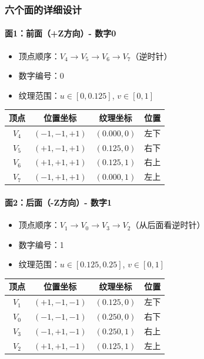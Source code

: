 \documentclass[12pt,a4paper]{article}
\begin{document}
\subsubsection{六个面的详细设计}

\paragraph{面1：前面（+Z方向）- 数字0}

\begin{itemize}
    \item 顶点顺序：$V_4 \to V_5 \to V_6 \to V_7$（逆时针）
    \item 数字编号：0
    \item 纹理范围：$u \in [0, 0.125]$, $v \in [0, 1]$
\end{itemize}

\begin{table}[H]
\centering
\begin{tabular}{|c|c|c|c|}
\hline
\textbf{顶点} & \textbf{位置坐标} & \textbf{纹理坐标} & \textbf{位置} \\
\hline
$V_4$ & $(-1, -1, +1)$ & $(0.000, 0)$ & 左下 \\
$V_5$ & $(+1, -1, +1)$ & $(0.125, 0)$ & 右下 \\
$V_6$ & $(+1, +1, +1)$ & $(0.125, 1)$ & 右上 \\
$V_7$ & $(-1, +1, +1)$ & $(0.000, 1)$ & 左上 \\
\hline
\end{tabular}
\end{table}

\paragraph{面2：后面（-Z方向）- 数字1}

\begin{itemize}
    \item 顶点顺序：$V_1 \to V_0 \to V_3 \to V_2$（从后面看逆时针）
    \item 数字编号：1
    \item 纹理范围：$u \in [0.125, 0.25]$, $v \in [0, 1]$
\end{itemize}

\begin{table}[H]
\centering
\begin{tabular}{|c|c|c|c|}
\hline
\textbf{顶点} & \textbf{位置坐标} & \textbf{纹理坐标} & \textbf{位置} \\
\hline
$V_1$ & $(+1, -1, -1)$ & $(0.125, 0)$ & 左下 \\
$V_0$ & $(-1, -1, -1)$ & $(0.250, 0)$ & 右下 \\
$V_3$ & $(-1, +1, -1)$ & $(0.250, 1)$ & 右上 \\
$V_2$ & $(+1, +1, -1)$ & $(0.125, 1)$ & 左上 \\
\hline
\end{tabular}
\end{table}
\end{document}
